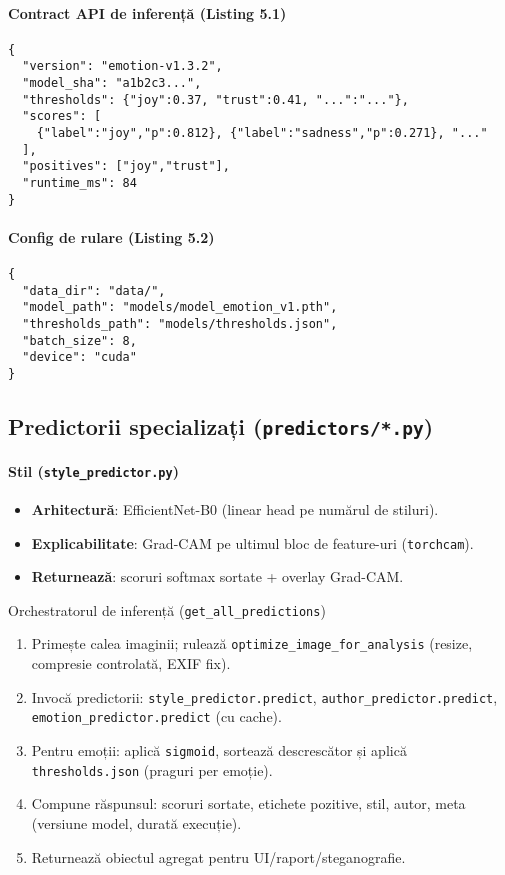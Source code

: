 \paragraph{Contract API de inferență (Listing 5.1)}
\begin{verbatim}
{
  "version": "emotion-v1.3.2",
  "model_sha": "a1b2c3...",
  "thresholds": {"joy":0.37, "trust":0.41, "...":"..."},
  "scores": [
    {"label":"joy","p":0.812}, {"label":"sadness","p":0.271}, "..."
  ],
  "positives": ["joy","trust"],
  "runtime_ms": 84
}
\end{verbatim}

\paragraph{Config de rulare (Listing 5.2)}
\begin{verbatim}
{
  "data_dir": "data/",
  "model_path": "models/model_emotion_v1.pth",
  "thresholds_path": "models/thresholds.json",
  "batch_size": 8,
  "device": "cuda"
}
\end{verbatim}

\subsection{Predictorii specializați (\texttt{predictors/*.py})}
\paragraph{Stil (\texttt{style\_predictor.py})}
\begin{itemize}
  \item \textbf{Arhitectură}: EfficientNet-B0 (linear head pe numărul de stiluri).
  \item \textbf{Explicabilitate}: Grad-CAM pe ultimul bloc de feature-uri (\texttt{torchcam}).
  \item \textbf{Returnează}: scoruri softmax sortate + overlay Grad-CAM.
\end{itemize}

\begin{algorithm}[H]
\caption{Orchestratorul de inferență (\texttt{get\_all\_predictions})}
\label{alg:c5-orchestrator}
\begin{enumerate}
  \item Primește calea imaginii; rulează \texttt{optimize\_image\_for\_analysis} (resize, compresie controlată, EXIF fix).
  \item Invocă predictorii: \texttt{style\_predictor.predict}, \texttt{author\_predictor.predict}, \texttt{emotion\_predictor.predict} (cu cache).
  \item Pentru emoții: aplică \texttt{sigmoid}, sortează descrescător și aplică \texttt{thresholds.json} (praguri per emoție).
  \item Compune răspunsul: scoruri sortate, etichete pozitive, stil, autor, meta (versiune model, durată execuție).
  \item Returnează obiectul agregat pentru UI/raport/steganografie.
\end{enumerate}
\end{algorithm}

